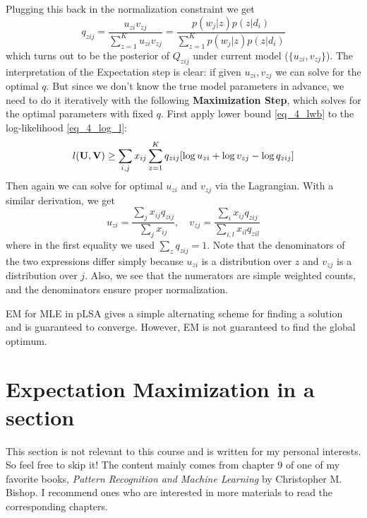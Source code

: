 \documentclass[../book-template.tex]{subfiles}
\begin{document}
Plugging this back in the normalization constraint we get
\begin{equation*}
	q_{zij} = \frac{u_{zi}v_{zj}}{\sum_{z=1}^{K}u_{zi}v_{zj}} = \frac{p(w_j|z)p(z|d_i)}{\sum_{z=1}^{K}p(w_j|z)p(z|d_i)}
\end{equation*}
which turns out to be the posterior of $Q_{zij}$ under current model ($\{u_{zi},v_{zj}\}$). The interpretation of the Expectation step is clear: if given $u_{zi},v_{zj}$ we can solve for the optimal $q$. But since we don't know the true model parameters in advance, we need to do it iteratively with the following \textbf{Maximization Step}, which solves for the optimal parameters with fixed $q$. First apply lower bound \eqref{eq_4_lwb} to the log-likelihood \eqref{eq_4_log_l}:
\begin{equation*}
	l({\bf U},{\bf V}) \geq \sum_{i,j}x_{ij} \sum_{z=1}^{K} q_{zij}[\log u_{zi} + \log v_{zj} - \log q_{zij}]
\end{equation*}
Then again we can solve for optimal $u_{zi}$ and $v_{zj}$ via the Lagrangian. With a similar derivation, we get
\begin{equation*}
	u_{zi}=\frac{\sum_{j}x_{ij}q_{zij}}{\sum_{j}x_{ij}},\quad v_{zj}=\frac{\sum_{i}x_{ij}q_{zij}}{\sum_{i,l}x_{il}q_{zil}}
\end{equation*}
where in the first equality we used $\sum_{z} q_{zij}=1$. Note that the denominators of the two expressions differ simply because $u_{zi}$ is a distribution over $z$ and $v_{zj}$ is a distribution over $j$. Also, we see that the numerators are simple weighted counts, and the denominators ensure proper normalization.
\par EM for MLE in pLSA gives a simple alternating scheme for finding a solution and is guaranteed to converge. However, EM is not guaranteed to find the global optimum.

\section{Expectation Maximization in a section}\label{sec_4_EM}
This section is not relevant to this course and is written for my personal interests. So feel free to skip it! 
The content mainly comes from chapter 9 of one of my favorite books, \emph{Pattern Recognition and Machine Learning} by Christopher M. Bishop. I recommend ones who are interested in more materials to read the corresponding chapters.
\end{document}
